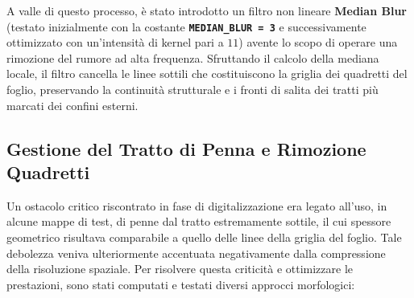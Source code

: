\documentclass[12pt,a4paper]{article}
\begin{document}
    A valle di questo processo, è stato introdotto un filtro non lineare \textbf{Median Blur} (testato inizialmente con la costante \textbf{\texttt{MEDIAN\_BLUR = 3}} e successivamente ottimizzato con un'intensità di kernel pari a $11$) avente lo scopo di operare una rimozione del rumore ad alta frequenza. Sfruttando il calcolo della mediana locale, il filtro cancella le linee sottili che costituiscono la griglia dei quadretti del foglio, preservando la continuità strutturale e i fronti di salita dei tratti più marcati dei confini esterni.

    \subsection{Gestione del Tratto di Penna e Rimozione Quadretti}
    Un ostacolo critico riscontrato in fase di digitalizzazione era legato all'uso, in alcune mappe di test, di penne dal tratto estremamente sottile, il cui spessore geometrico risultava comparabile a quello delle linee della griglia del foglio. Tale debolezza veniva ulteriormente accentuata negativamente dalla compressione della risoluzione spaziale. Per risolvere questa criticità e ottimizzare le prestazioni, sono stati computati e testati diversi approcci morfologici:
\end{document}
